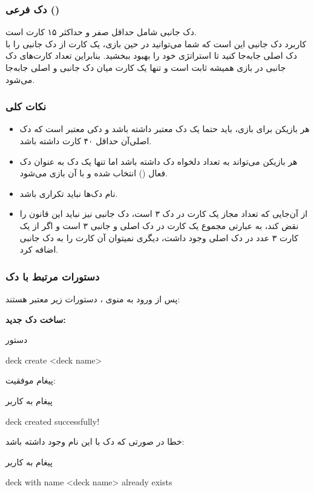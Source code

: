 \documentclass[]{article}
\begin{document}
\subsubsection*{{\titr دک فرعی ()}}
دک جانبی شامل حداقل صفر و حداکثر ۱۵ کارت است.
\\
کاربرد دک جانبی این است که شما می‌توانید در حین بازی، یک کارت از دک جانبی را 
با دک اصلی جا‌به‌جا کنید تا استراتژی خود را بهبود ببخشید. بنابراین تعداد 
کارت‌های دک جانبی در بازی همیشه ثابت است و تنها یک کارت میان دک جانبی و اصلی 
جا‌به‌جا می‌شود.

\subsubsection*{{\titr نکات کلی}}
\begin{itemize}
	\item
	هر بازیکن برای بازی‌، باید حتما یک دک معتبر داشته باشد و دکی معتبر است 
	که دک اصلی‌آن حداقل ۴۰ کارت داشته باشد.
	\item
	هر بازیکن می‌تواند به تعداد دلخواه دک داشته باشد اما تنها یک دک به عنوان 
	دک فعال () انتخاب شده و با آن بازی می‌شود.
	\item
	نام دک‌ها نباید تکراری باشد.
	\item
	از آن‌جایی که تعداد مجاز یک کارت در دک ۳ است، دک جانبی نیز نباید این 
	قانون را نقض کند، به عبارتی مجموع یک کارت در دک اصلی و جانبی ۳ است و 
	اگر از 
	یک کارت ۳ عدد در دک اصلی وجود داشت، دیگری نمیتوان آن کارت را به دک 
	جانبی 
	اضافه کرد.
\end{itemize}

\subsubsection*{{\titr دستورات مرتبط با دک}}
پس از ورود به منوی ، دستورات زیر معتبر هستند:

\vspace{.5cm}
\textbf{ساخت دک جدید:}
\begin{mybox}[colback=yellow]{دستور}
	\begin{latin}	
		deck create <deck name>
	\end{latin}
\end{mybox}

پیغام موفقیت:
\begin{mybox}[colback=yellow]{پیغام به کاربر}
	\begin{latin}	
		deck created successfully!
	\end{latin}
\end{mybox}
خطا در صورتی که دک با این نام وجود داشته باشد:
\begin{mybox}[colback=yellow]{پیغام به کاربر}
	\begin{latin}	
		deck with name <deck name> already exists
	\end{latin}
\end{mybox}
\end{document}
